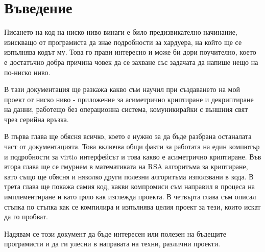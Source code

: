 \section*{Въведение}
Писането на код на ниско ниво винаги е било предизвикателно начинание, изискващо от програмиста да знае подробности за хардуера, на който ще се изпълнява кодът му. Това го прави интересно и може би дори поучително, което е достатъчно добра причина човек да се захване със задачата да напише нещо на по-ниско ниво.

В тази документация ще разкажа какво съм научил при създаването на мой проект от ниско ниво - приложение за асиметрично криптиране и декриптиране на данни, работещо без операционна система, комуникирайки с външния свят чрез серийна връзка.

В първа глава ще обясня всичко, което е нужно за да бъде разбрана останалата част от документацията. Това включва общи факти за работата на един компютър и подробности за virtio интерфейсът и това какво е асиметрично криптиране. Във втора глава ще се гмурнем в математиката на RSA алгоритъма за криптиране, като също ще обясня и няколко други полезни алгоритъма използвани в кода. В трета глава ще покажа самия код, какви компромиси съм направил в процеса на имплементиране и като цяло как изглежда проекта. В четвърта глава съм описал стъпка по стъпка как се компилира и изпълнява целия проект за тези, които искат да го пробват.

Надявам се този документ да бъде интересен или полезен на бъдещите програмисти и да ги улесни в направата на техни, различни проекти.
